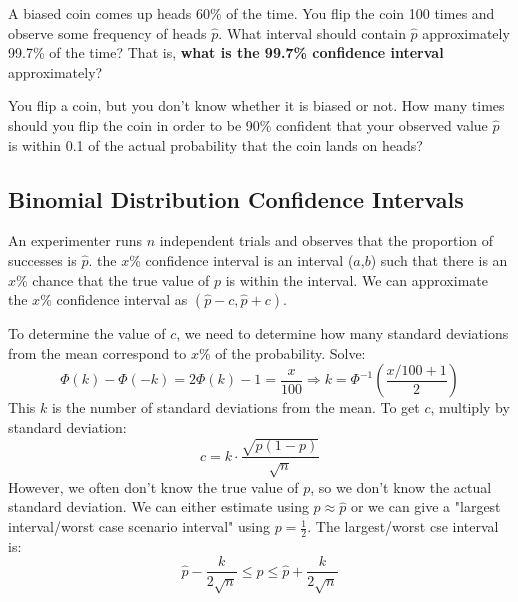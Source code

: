 \documentclass[titlepage, 12pt, leqno]{article}
\begin{document}
\begin{ex}
    A biased coin comes up heads 60\% of the time. You flip the coin 100 times and observe some frequency of heads $\hat p$. What interval should contain $\hat p$ approximately 99.7\% of the time? That is, \textbf{what is the 99.7\% confidence interval} approximately?
\end{ex}

\begin{ex}
    You flip a coin, but you don't know whether it is biased or not. How many times should you flip the coin in order to be 90\% confident that your observed value $\hat p$ is within 0.1 of the actual probability that the coin lands on heads?
\end{ex}

\subsection{Binomial Distribution Confidence Intervals}
An experimenter runs $n$ independent trials and observes that the proportion of successes is $\hat p$. the $x$\% confidence interval is an interval ($a$,$b$) such that there is an $x$\% chance that the true value of $p$ is within the interval. We can approximate the $x$\% confidence interval as $(\hat p - c, \hat p + c)$.

To determine the value of $c$, we need to determine how many standard deviations from the mean correspond to $x$\% of the probability. Solve:
\[
    \Phi(k) - \Phi(-k) = 2\Phi(k) - 1 = \frac{x}{100} \Longrightarrow k = \Phi^{-1} \left(\frac{x/100+1}{2} \right)
\]
This $k$ is the number of standard deviations from the mean. To get $c$, multiply by standard deviation:
\[
    c = k \cdot \frac{\sqrt{p(1-p)}}{\sqrt n} 
\]
However, we often don't know the true value of $p$, so we don't know the actual standard deviation. We can either estimate using $p \approx \hat p$ or we can give a "largest interval/worst case scenario interval" using $p = \frac{1}{2}$. The largest/worst cse interval is:
\[
\hat p - \frac{k}{2\sqrt n} \le p \le \hat p + \frac{k}{2\sqrt n} 
\]
\end{document}
